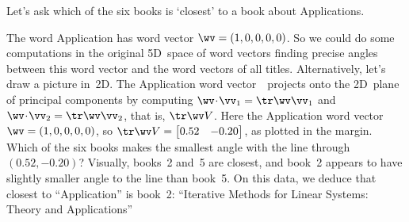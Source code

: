 \begin{example} \label{eg:bks6q}
Let's ask which of the six books is `closest' to a book about Applications.
\begin{solution} 
The word Application has word vector \(\wv=(1,0,0,0,0)\).
So we could do some computations in the original 5D~space of word vectors finding precise angles between this word vector and the word vectors of all titles.
Alternatively, let's draw a picture in~2D.
The Application word vector~\wv\ projects onto the 2D~plane of principal components by computing \(\wv\cdot\vv_1=\tr\wv\vv_1\) and \(\wv\cdot\vv_2=\tr\wv\vv_2\), that is, \(\tr\wv V\).
Here the Application word vector \(\wv=(1,0,0,0,0)\), so \(\tr\wv V=\begin{bmatrix} 0.52 & -0.20 \end{bmatrix}\), as plotted in the margin.
Which of the six books makes the smallest angle with the line through \((0.52,-0.20)\)?
Visually, books~2 and~5 are closest, and book~2 appears to have slightly smaller angle to the line than book~5.
On this data, we deduce that closest to ``Application'' is book~2: ``Iterative Methods for Linear Systems: Theory and Applications''
\end{solution}
\end{example}






